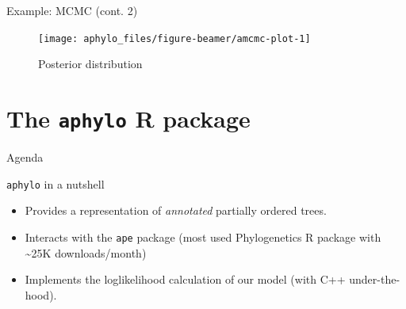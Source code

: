 \documentclass[9pt,ignorenonframetext,]{beamer}
\begin{document}
\begin{frame}[t]{Example: MCMC (cont. 2)}

\footnotesize

\begin{figure}

{\centering \texttt{[image: aphylo\_files/figure-beamer/amcmc-plot-1]} 

}

\caption{Posterior distribution}\label{fig:amcmc-plot}
\end{figure}

\normalsize

\end{frame}

\section{\texorpdfstring{The \texttt{aphylo} R
package}{The aphylo R package}}\label{the-aphylo-r-package}

\begin{frame}[t]{Agenda}

\tableofcontents[currentsection]

\end{frame}

\begin{frame}[fragile]{\texttt{aphylo} in a nutshell}

\begin{itemize}
\item
  Provides a representation of \emph{annotated} partially ordered trees.
  \pause
\item
  Interacts with the \texttt{ape} package (most used Phylogenetics R
  package with \textasciitilde{}25K downloads/month) \pause
\item
  Implements the loglikelihood calculation of our model (with C++
  under-the-hood).
\end{itemize}

\end{frame}
\end{document}
